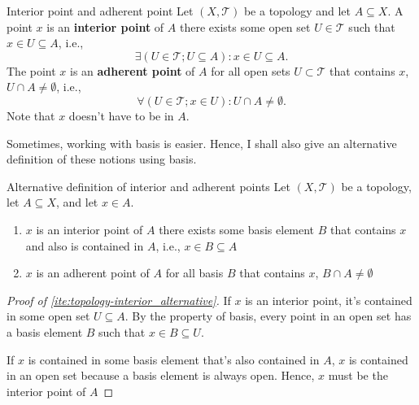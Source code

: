 \begin{df}{Interior point and adherent point}{}
  Let \((X, \mathcal{T})\) be a topology and let \(A \subseteq X\). A point \(x\) is an
  \textbf{interior point} of \(A\) \ifft there exists some open set \(U \in \mathcal{T}\)
  such that \(x \in U \subseteq A\), i.e., 
  \begin{equation}
    \exists (U \in \mathcal{T} ; U \subseteq A) : x \in U \subseteq A.
  \end{equation}
  The point \(x\) is an \textbf{adherent point} of \(A\) \ifft for all open sets
  \(U \subset \mathcal{T}\) that contains \(x\), \(U \cap A \neq \emptyset\), i.e.,
  \begin{equation}
    \forall (U \in \mathcal{T} ; x \in U) : U \cap A \neq \emptyset.
  \end{equation}
  Note that \(x\) doesn't have to be in \(A\).
\end{df}

Sometimes, working with basis is easier. Hence, I shall also give an alternative
definition of these notions using basis.

\begin{cor}{Alternative definition of interior and adherent points}{}
  Let \((X, \mathcal{T})\) be a topology, let \(A \subseteq X\), and let \(x \in A\).
  \begin{enumerate}
    \item \(x\) is an interior point of \(A\) \ifft there exists some basis element \(B\)
          that contains \(x\) and also is contained in \(A\), i.e., \(x \in B \subseteq A\)
          \label{ite:topology-interior_alternative}
    \item \(x\) is an adherent point of \(A\) \ifft for all basis \(B\) that contains
          \(x\), \(B \cap A \neq \emptyset\) \label{ite:topology-closure_alternative}
  \end{enumerate}
\end{cor}
\begin{proof}[Proof of \cref{ite:topology-interior_alternative}]
  \forwarddir If \(x\) is an interior point, it's contained in some open set
  \(U \subseteq A\). By the property of basis, every point in an open set has a basis
  element \(B\) such that \(x \in B \subseteq U\).

  \backwarddir If \(x\) is contained in some basis element that's also contained in
  \(A\), \(x\) is contained in an open set because a basis element is always open.
  Hence, \(x\) must be the interior point of \(A\)
\end{proof}

